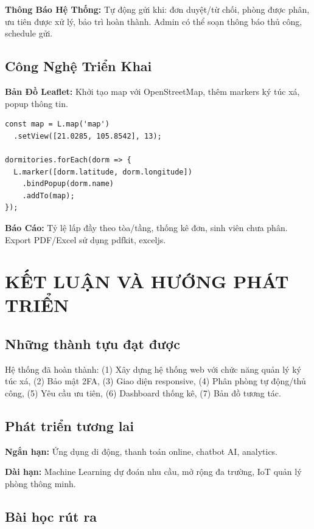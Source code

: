\documentclass[12pt,a4paper]{article}
\begin{document}
\textbf{Thông Báo Hệ Thống:} Tự động gửi khi: đơn duyệt/từ chối, phòng được phân, ưu tiên được xử lý, bảo trì hoàn thành. Admin có thể soạn thông báo thủ công, schedule gửi.

\subsection{Công Nghệ Triển Khai}

\textbf{Bản Đồ Leaflet:} Khởi tạo map với OpenStreetMap, thêm markers ký túc xá, popup thông tin.

\begin{lstlisting}[caption=Khởi tạo bản đồ]
const map = L.map('map')
  .setView([21.0285, 105.8542], 13);
  
dormitories.forEach(dorm => {
  L.marker([dorm.latitude, dorm.longitude])
    .bindPopup(dorm.name)
    .addTo(map);
});
\end{lstlisting}

\textbf{Báo Cáo:} Tỷ lệ lấp đầy theo tòa/tầng, thống kê đơn, sinh viên chưa phân. Export PDF/Excel sử dụng pdfkit, exceljs.

\newpage
\section{KẾT LUẬN VÀ HƯỚNG PHÁT TRIỂN}

\subsection{Những thành tựu đạt được}

Hệ thống đã hoàn thành: (1) Xây dựng hệ thống web với chức năng quản lý ký túc xá, (2) Bảo mật 2FA, (3) Giao diện responsive, (4) Phân phòng tự động/thủ công, (5) Yêu cầu ưu tiên, (6) Dashboard thống kê, (7) Bản đồ tương tác.

\subsection{Phát triển tương lai}

\textbf{Ngắn hạn:} Ứng dụng di động, thanh toán online, chatbot AI, analytics.

\textbf{Dài hạn:} Machine Learning dự đoán nhu cầu, mở rộng đa trường, IoT quản lý phòng thông minh.

\subsection{Bài học rút ra}
\end{document}
